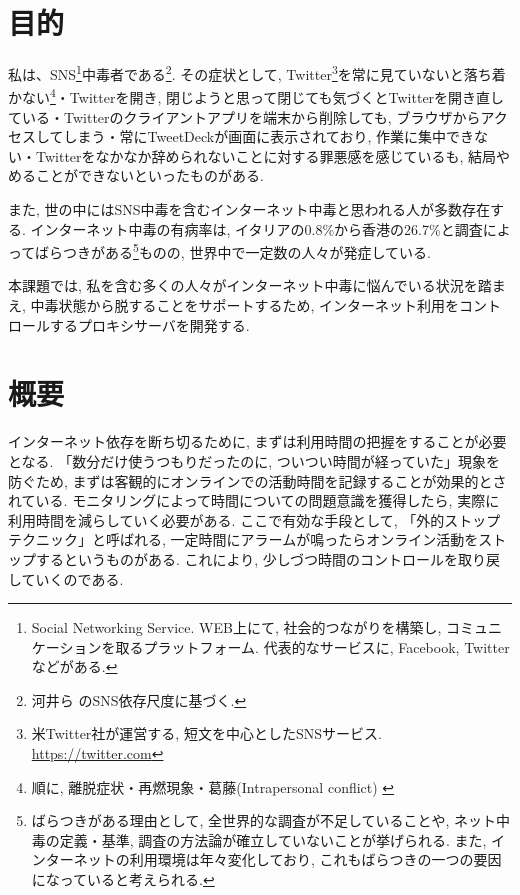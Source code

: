 \documentclass[10pt,a4paper,uplatex,a4j,dvipdfmx]{jsarticle}
\begin{document}
    \begin{multicols}{2}

    \section{目的}
    私は、SNS\footnote{Social Networking Service. WEB上にて, 社会的つながりを構築し, コミュニケーションを取るプラットフォーム. 代表的なサービスに, Facebook, Twitterなどがある.}中毒者である\footnote{河井ら \cite{kawai2011sns} のSNS依存尺度に基づく.}.
    その症状として, Twitter\footnote{米Twitter社が運営する, 短文を中心としたSNSサービス. \url{https://twitter.com}}を常に見ていないと落ち着かない\footnote{順に, 離脱症状・再燃現象・葛藤(Intrapersonal conflict) \cite{griffiths2005} \label{tw}}・Twitterを開き, 閉じようと思って閉じても気づくとTwitterを開き直している・Twitterのクライアントアプリを端末から削除しても, ブラウザからアクセスしてしまう・常にTweetDeckが画面に表示されており, 作業に集中できない・Twitterをなかなか辞められないことに対する罪悪感を感じているも, 結局やめることができないといったものがある.
    
    また, 世の中にはSNS中毒を含むインターネット中毒と思われる人が多数存在する.
    インターネット中毒の有病率は, イタリアの0.8\%から香港の26.7\%と調査によってばらつきがある\footnote{ばらつきがある理由として, 全世界的な調査が不足していることや, ネット中毒の定義・基準, 調査の方法論が確立していないことが挙げられる\cite{IAreview}. また, インターネットの利用環境は年々変化しており, これもばらつきの一つの要因になっていると考えられる.}ものの, 世界中で一定数の人々が発症している\cite{IAreview}.
    
  本課題では, 私を含む多くの人々がインターネット中毒に悩んでいる状況を踏まえ, 中毒状態から脱することをサポートするため, インターネット利用をコントロールするプロキシサーバを開発する.



    \section{概要}
    インターネット依存を断ち切るために, まずは利用時間の把握をすることが必要となる. 「数分だけ使うつもりだったのに, ついつい時間が経っていた」現象を防ぐため, まずは客観的にオンラインでの活動時間を記録することが効果的とされている\cite{internetaddiction}.
    モニタリングによって時間についての問題意識を獲得したら, 実際に利用時間を減らしていく必要がある. ここで有効な手段として, 「外的ストップテクニック」と呼ばれる, 一定時間にアラームが鳴ったらオンライン活動をストップするというものがある\cite{internetaddiction}. これにより, 少しづつ時間のコントロールを取り戻していくのである.


\end{multicols}
\end{document}
